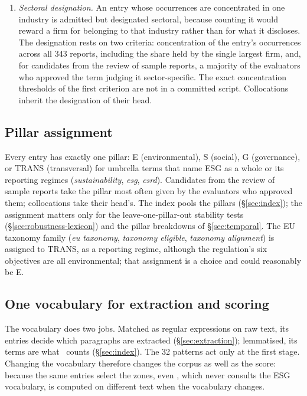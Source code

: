 \begin{enumerate}
  removes (\texttt{co2e?}, \texttt{scope\textbackslash s*[123]}, ISO standard
  numbers), or a phrase does not survive lemmatisation
  (\texttt{paris\textbackslash s+agreement}, \emph{just transition}), the entry
  is written as a regular expression. Patterns act at extraction only
  (\S\ref{sec:lexicon-one}). There are 32.
\item \emph{Sectoral designation.} An entry whose occurrences are concentrated
  in one industry is admitted but designated sectoral, because counting it
  would reward a firm for belonging to that industry rather than for what it
  discloses. The designation rests on two criteria: concentration of the
  entry's occurrences across all 343 reports, including the share held by the
  single largest firm, and, for candidates from the review of sample reports,
  a majority of the evaluators who approved the term judging it
  sector-specific. The exact concentration thresholds of the first criterion
  are not in a committed script. Collocations inherit the designation of their
  head.
\end{enumerate}

\subsection{Pillar assignment}
\label{sec:lexicon-pillars}

Every entry has exactly one pillar: E (environmental), S (social), G
(governance), or TRANS (transversal) for umbrella terms that name ESG as a
whole or its reporting regimes (\emph{sustainability}, \emph{esg},
\emph{csrd}). Candidates from the review of sample reports take the pillar most
often given by the evaluators who approved them; collocations take their
head's. The index pools the pillars (\S\ref{sec:index}); the assignment matters
only for the leave-one-pillar-out stability tests
(\S\ref{sec:robustness-lexicon}) and the pillar breakdowns of
\S\ref{sec:temporal}. The EU taxonomy family (\emph{eu taxonomy},
\emph{taxonomy eligible}, \emph{taxonomy alignment}) is assigned to TRANS, as a
reporting regime, although the regulation's six objectives are all
environmental; that assignment is a choice and could reasonably be E.

\subsection{One vocabulary for extraction and scoring}
\label{sec:lexicon-one}

The vocabulary does two jobs. Matched as regular expressions on raw text, its
entries decide which paragraphs are extracted (\S\ref{sec:extraction});
lemmatised, its terms are what \SUS\ counts (\S\ref{sec:index}). The 32
patterns act only at the first stage. Changing the vocabulary therefore
changes the corpus as well as the score: because the same entries select the
zones, even \SEN, which never consults the ESG vocabulary, is computed on
different text when the vocabulary changes.

